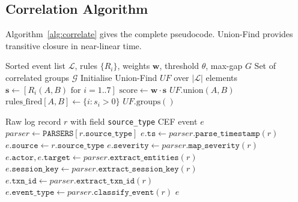 \subsection{Correlation Algorithm}
\label{sec:algorithm}

Algorithm~\ref{alg:correlate} gives the complete pseudocode.
Union-Find provides transitive closure in near-linear time.

\begin{algorithm}[t]
\caption{Multi-Source Log Correlation}
\label{alg:correlate}
\begin{algorithmic}[1]
\Require Sorted event list $\mathcal{L}$, rules $\{R_i\}$,
         weights $\mathbf{w}$, threshold $\theta$, max-gap $G$
\Ensure  Set of correlated groups $\mathcal{G}$
\State Initialise Union-Find $\mathit{UF}$ over $|\mathcal{L}|$ elements
  \State $\mathbf{s} \gets [R_i(A,B) \text{ for } i=1..7]$
  \State $\text{score} \gets \mathbf{w} \cdot \mathbf{s}$
    \State $\mathit{UF}.\text{union}(A, B)$
    \State $\text{rules\_fired}[A,B] \gets \{i : s_i > 0\}$
  \EndIf
\EndFor
\State \Return $\mathit{UF}.\text{groups}()$
\end{algorithmic}
\end{algorithm}

\begin{algorithm}[t]
\caption{CEF Normalisation}
\label{alg:normalise}
\begin{algorithmic}[1]
\Require Raw log record $r$ with field \texttt{source\_type}
\Ensure CEF event $e$
\State $\textit{parser} \gets \texttt{PARSERS}[r.\texttt{source\_type}]$
\State $e.\texttt{ts} \gets \textit{parser}.\texttt{parse\_timestamp}(r)$
\State $e.\texttt{source} \gets r.\texttt{source\_type}$
\State $e.\texttt{severity} \gets \textit{parser}.\texttt{map\_severity}(r)$
\State $e.\texttt{actor}, e.\texttt{target} \gets \textit{parser}.\texttt{extract\_entities}(r)$
\State $e.\texttt{session\_key} \gets \textit{parser}.\texttt{extract\_session\_key}(r)$
\State $e.\texttt{txn\_id} \gets \textit{parser}.\texttt{extract\_txn\_id}(r)$
\State $e.\texttt{event\_type} \gets \textit{parser}.\texttt{classify\_event}(r)$
\State \Return $e$
\end{algorithmic}
\end{algorithm}

